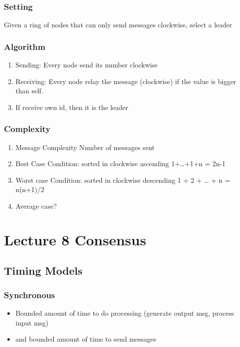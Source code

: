 \documentclass[11pt]{article}
\begin{document}
\subsubsection{Setting}
\label{sec:org7567e1b}
Given a ring of nodes that can only send messages clockwise, select a leader
\subsubsection{Algorithm}
\label{sec:org80a8bb4}
\begin{enumerate}
  \item Sending: Every node send its number clockwise
  \item Receiving: Every node relay the message (clockwise) if the value is bigger
        than self.
  \item If receive own id, then it is the leader
\end{enumerate}
\subsubsection{Complexity}
\label{sec:org86f55de}
\begin{enumerate}
  \item Message Complexity
        \label{sec:org2e23e03}
        Number of messages sent
  \item Best Case
        \label{sec:org4232628}
        Condition: sorted in clockwise ascending
        1+\ldots{}+1+n = 2n-1
  \item Worst case
        \label{sec:orgcfafe84}
        Condition: sorted in clockwise descending
        1 + 2 + \ldots{} + n = n(n+1)/2
  \item Average case?
        \label{sec:orgaeec55c}
\end{enumerate}
\section{Lecture 8 Consensus}
\label{sec:org9287394}
\subsection{Timing Models}
\label{sec:org9be41b7}
\subsubsection{Synchronous}
\label{sec:org7fd73e7}
\begin{itemize}
  \item Bounded amount of time to do processing (generate output msg, process input
        msg)
  \item and bounded amount of time to send messages
\end{itemize}
\end{document}
